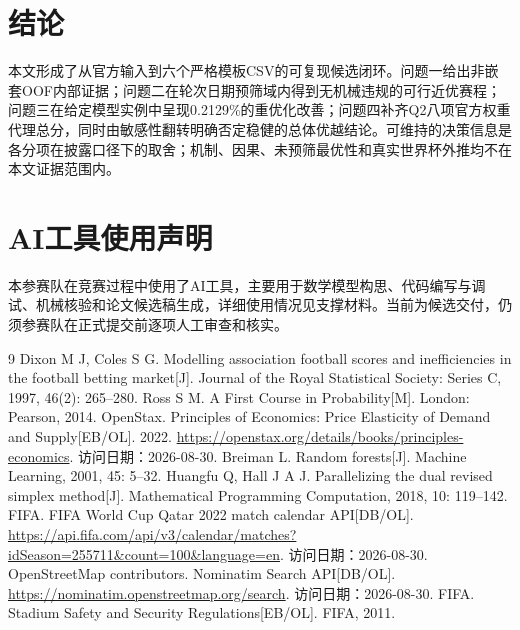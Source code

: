 \documentclass[UTF8,11pt,a4paper]{ctexart}
\begin{document}
\section{结论}
本文形成了从官方输入到六个严格模板CSV的可复现候选闭环。问题一给出非嵌套OOF内部证据；问题二在轮次日期预筛域内得到无机械违规的可行近优赛程；问题三在给定模型实例中呈现0.2129\%的重优化改善；问题四补齐Q2八项官方权重代理总分，同时由敏感性翻转明确否定稳健的总体优越结论。可维持的决策信息是各分项在披露口径下的取舍；机制、因果、未预筛最优性和真实世界杯外推均不在本文证据范围内。

\section*{AI工具使用声明}
本参赛队在竞赛过程中使用了AI工具，主要用于数学模型构思、代码编写与调试、机械核验和论文候选稿生成，详细使用情况见支撑材料。当前为候选交付，仍须参赛队在正式提交前逐项人工审查和核实。

\begin{thebibliography}{9}
 Dixon M J, Coles S G. Modelling association football scores and inefficiencies in the football betting market[J]. Journal of the Royal Statistical Society: Series C, 1997, 46(2): 265--280.
 Ross S M. A First Course in Probability[M]. London: Pearson, 2014.
 OpenStax. Principles of Economics: Price Elasticity of Demand and Supply[EB/OL]. 2022. \url{https://openstax.org/details/books/principles-economics}. 访问日期：2026-08-30.
 Breiman L. Random forests[J]. Machine Learning, 2001, 45: 5--32.
 Huangfu Q, Hall J A J. Parallelizing the dual revised simplex method[J]. Mathematical Programming Computation, 2018, 10: 119--142.
 FIFA. FIFA World Cup Qatar 2022 match calendar API[DB/OL]. \url{https://api.fifa.com/api/v3/calendar/matches?idSeason=255711&count=100&language=en}. 访问日期：2026-08-30.
 OpenStreetMap contributors. Nominatim Search API[DB/OL]. \url{https://nominatim.openstreetmap.org/search}. 访问日期：2026-08-30.
 FIFA. Stadium Safety and Security Regulations[EB/OL]. FIFA, 2011.
\end{thebibliography}

\appendix
\end{document}

